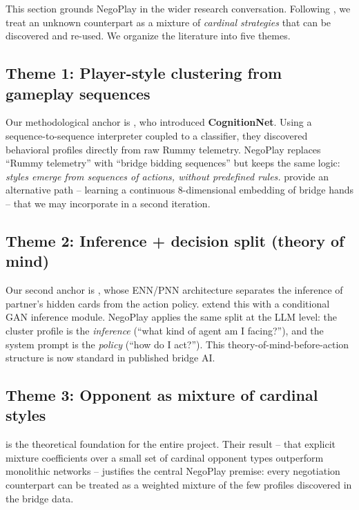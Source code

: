 \documentclass[11pt, a4paper, oneside, openany]{report}
\begin{document}
This section grounds NegoPlay in the wider research conversation. Following \citet{lockett2007evolving}, we treat an unknown counterpart as a mixture of \emph{cardinal strategies} that can be discovered and re-used. We organize the literature into five themes.

\subsection*{Theme 1: Player-style clustering from gameplay sequences}

Our methodological anchor is \citet{talwadker2022cognitionnet}, who introduced \textbf{CognitionNet}. Using a sequence-to-sequence interpreter coupled to a classifier, they discovered behavioral profiles directly from raw Rummy telemetry. NegoPlay replaces ``Rummy telemetry'' with ``bridge bidding sequences'' but keeps the same logic: \emph{styles emerge from sequences of actions, without predefined rules.} \citet{sztyber2023bridgehand} provide an alternative path -- learning a continuous 8-dimensional embedding of bridge hands -- that we may incorporate in a second iteration.

\subsection*{Theme 2: Inference + decision split (theory of mind)}

Our second anchor is \citet{rong2019competitive}, whose ENN/PNN architecture separates the inference of partner's hidden cards from the action policy. \citet{wang2024inference} extend this with a conditional GAN inference module. NegoPlay applies the same split at the LLM level: the cluster profile is the \emph{inference} (``what kind of agent am I facing?''), and the system prompt is the \emph{policy} (``how do I act?''). This theory-of-mind-before-action structure is now standard in published bridge AI.

\subsection*{Theme 3: Opponent as mixture of cardinal styles}

\citet{lockett2007evolving} is the theoretical foundation for the entire project. Their result -- that explicit mixture coefficients over a small set of cardinal opponent types outperform monolithic networks -- justifies the central NegoPlay premise: every negotiation counterpart can be treated as a weighted mixture of the few profiles discovered in the bridge data.
\end{document}
